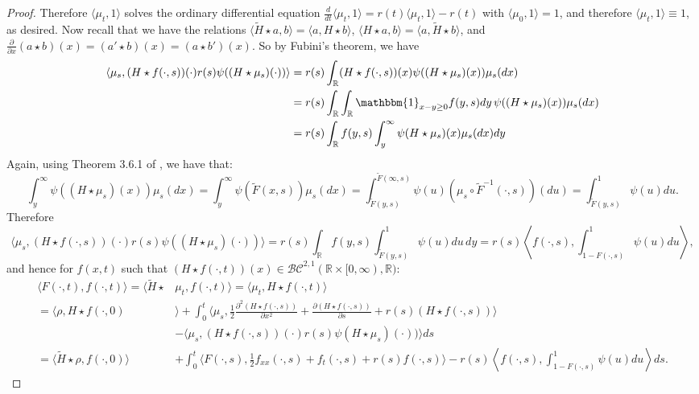 \documentclass{article}
\newcommand{\B}[1]{\mathbb{#1}}
\newcommand{\C}[1]{\mathcal{#1}}
\newcommand{\is}{\mathbbm{1}}
\begin{document}
\begin{proof}
    Therefore $\langle \mu_t,1\rangle$ solves the ordinary differential equation $\frac{d}{dt}\langle \mu_t,1\rangle = r(t)\langle \mu_t,1\rangle - r(t)$ with $\langle \mu_0,1\rangle=1$, and therefore $\langle \mu_t,1\rangle \equiv 1$, as desired. Now recall that we have the relations $\langle \tilde{H}\star a,b\rangle =\langle a,H\star b\rangle$, $\langle H\star a, b\rangle = \langle a,\tilde{H}\star b\rangle$, and $\frac{\partial}{\partial x}(a\star b)(x)=(a'\star b)(x) = (a\star b')(x)$. So by Fubini's theorem, we have
    \begin{align*}
        \langle \mu_s, (H\star f(\cdot,s))(\cdot)r(s)\psi((H\star \mu_s)(\cdot))\rangle &= r(s)\int_{\B{R}}(H\star f(\cdot,s))(x)\psi((H\star \mu_s)(x))\mu_s(dx) \\ &=r(s)\int_{\B{R}}\int_{\B{R}}\is_{x-y\geq 0}f(y,s)dy\,\psi((H\star \mu_s)(x))\mu_s(dx) \\
        &= r(s)\int_{\B{R}}f(y,s)\int_{y}^{\infty}\psi(H\star \mu_s)(x)\mu_s(dx)dy 
    \end{align*}
    Again, using Theorem 3.6.1 of \cite{bogachev}, we have that:
    $$\int_y^\infty \psi((H\star \mu_s)(x))\mu_s(dx)=\int_{y}^\infty \psi(\tilde{F}(x,s))\mu_s(dx) = \int_{\tilde{F}(y,s)}^{\tilde{F}(\infty,s)}\psi(u)(\mu_s \circ \tilde{F}^{-1}(\cdot,s))(du)=\int_{\tilde{F}(y,s)}^1 \psi(u)du.$$
    Therefore
    $$\langle \mu_s, (H\star f(\cdot,s))(\cdot)r(s)\psi((H\star \mu_s)(\cdot))\rangle = r(s)\int_{\B{R}}f(y,s)\int_{\tilde{F}(y,s)}^1 \psi(u)du\,dy = r(s) \left\langle f(\cdot,s), \int_{1-F(\cdot,s)}^1 \psi(u)du\right\rangle,$$
    and hence for $f(x,t)$ such that $(H\star f(\cdot,t))(x)\in \C{BC}^{2,1}(\B{R}\times [0,\infty),\B{R})$:
    \begin{align*}
        \langle F(\cdot,t),f(\cdot,t)\rangle = \langle \tilde{H}\star &\mu_t,f(\cdot,t)\rangle = \langle \mu_t , H\star f(\cdot,t)\rangle \\
        = \langle \rho,H\star f(\cdot,0)&\rangle + \int_0^t \langle \mu_s, \frac12 \frac{\partial^2 (H\star f(\cdot,s))}{\partial x^2}+\frac{\partial (H\star f(\cdot,s))}{\partial s} + r(s)(H\star f(\cdot,s))\rangle \\ &- \langle \mu_s,(H\star f(\cdot,s))(\cdot)r(s)\psi(H\star\mu_s)(\cdot))\rangle ds \\
        = \langle\tilde{H}\star \rho,f(\cdot,0)\rangle & + \int_0^t \langle F(\cdot,s), \frac12 f_{xx}(\cdot,s)+f_t(\cdot,s) + r(s)f(\cdot,s)\rangle - r(s)\left\langle f(\cdot,s),\int_{1-F(\cdot,s)}^1 \psi(u)du\right\rangle ds.
    \end{align*}\end{proof}
\end{document}

